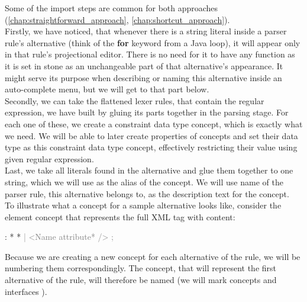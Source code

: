 Some of the import steps are common for both approaches (\ref{chap:straightforward_approach}, \ref{chap:shortcut_approach}).
\\

Firstly, we have noticed, that whenever there is a string literal inside a parser rule's alternative (think of the \textbf{for} keyword from a Java loop), it will appear only in that rule's projectional editor.
There is no need for it to have any function as it is set in stone as an unchangeable part of that alternative's appearance.
It might serve its purpose when describing or naming this alternative inside an auto-complete menu, but we will get to that part below.
\\

Secondly, we can take the flattened lexer rules, that contain the regular expression, we have built by gluing its parts together in the parsing stage.
For each one of these, we create a constraint data type concept, which is exactly what we need.
We will be able to later create properties of concepts and set their data type as this constraint data type concept, effectively restricting their value using given regular expression.
\\

Last, we take all literals found in the alternative and glue them together to one string, which we will use as the alias of the concept.
We will use name of the parser rule, this alternative belongs to, as the description text for the concept.
\\

To illustrate what a concept for a sample alternative looks like, consider the element concept that represents the full XML tag with content:

\begin{antlr}
	      :   \literal{<}  * \literal{>} * \literal{</}  \literal{>}
             \textcolor{gray}{|   \ap<\ap Name attribute* \ap/>\ap}
             \textcolor{gray}{;}
\end{antlr}

Because we are creating a new concept for each alternative of the rule, we will be numbering them correspondingly.
The concept, that will represent the first alternative of the  rule, will therefore be named 
(we will mark concepts  and interfaces ).

